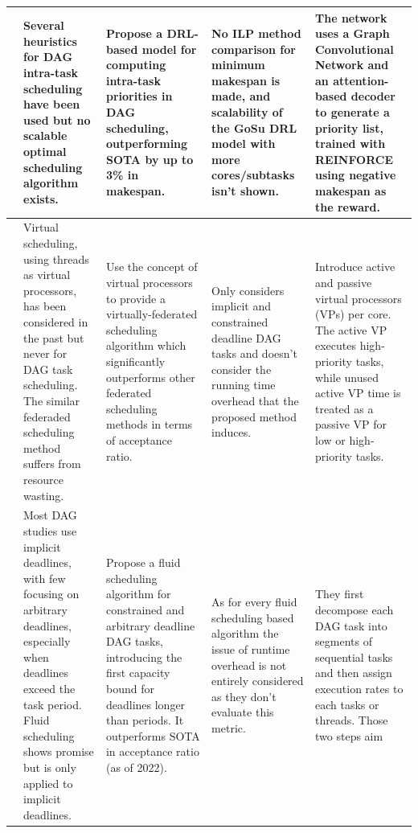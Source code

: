 \begin{table}
    \centering
    \begin{tabular}[]{|p{0.15in}|p{1.6in}|p{1.6in}|p{1.6in}|p{1.6in}|}
        \hline
        \cite{Lee2021GlobalDagSchedDRL} & Several heuristics for DAG intra-task scheduling
        have been used but no scalable optimal scheduling algorithm exists. &
        Propose a DRL-based model for computing intra-task priorities in DAG scheduling, 
        outperforming SOTA by up to 3\% in makespan. & No ILP method comparison for minimum makespan
        is made, and scalability of the GoSu DRL model with more cores/subtasks isn't shown. & The network uses a Graph Convolutional Network 
        and an attention-based decoder to generate a priority list, 
        trained with REINFORCE using negative makespan as the reward.  \\
        \hline
        \cite{Jiang2023SchedVirtualProcs} & 
        Virtual scheduling, using threads as virtual processors, 
        has been considered in the past but never for DAG task scheduling.
        The similar federaded scheduling method 
        suffers from resource wasting. & Use the concept of virtual processors
        to provide a virtually-federated scheduling algorithm
        which significantly outperforms other federated scheduling methods
        in terms of acceptance ratio. & Only considers implicit and constrained deadline DAG tasks
        and doesn't consider the running time overhead that the proposed method induces. 
        & Introduce active and passive virtual processors (VPs) per core. The active VP executes high-priority tasks, 
        while unused active VP time is treated as a passive VP for low or high-priority tasks.\\
        \hline
        \cite{GuanFluidDag2022} & Most DAG studies use implicit deadlines, 
        with few focusing on arbitrary deadlines, especially when deadlines exceed the task period. Fluid scheduling
         shows promise but is only applied to implicit deadlines. & Propose a fluid scheduling algorithm for constrained and arbitrary deadline DAG tasks, 
         introducing the first capacity bound for deadlines longer than periods. It outperforms SOTA in acceptance ratio (as of 2022). & As for every fluid scheduling based algorithm
        the issue of runtime overhead is not 
        entirely considered as they don't evaluate this metric. & They first decompose each DAG task
        into segments of sequential tasks and then assign execution rates
        to each tasks or threads. Those two steps aim 

\end{tabular}
\end{table}
